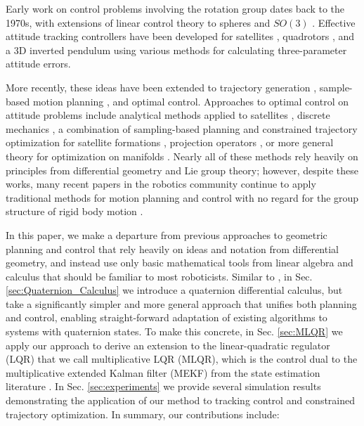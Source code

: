 \documentclass[letterpaper, 10 pt, conference]{ieeeconf}  %
\begin{document}
    Early work on control problems involving the rotation group dates back to the 1970s, 
    with extensions of linear control theory to spheres \cite{Brockett1973} and $SO(3)$ 
    \cite{Baillieul1978}. Effective attitude tracking controllers have been developed for 
    satellites \cite{wie1985quaternion}, quadrotors \cite{Fresk2013,Liu2015,lee2010geometric,
    Johnson2005,watterson2020control,mellinger2011minimum}, and a 3D inverted pendulum 
    \cite{Chaturvedi2009}  using various methods for calculating three-parameter attitude 
    errors. 
    
    More recently, these ideas have been extended to trajectory generation \cite{Zefran1998}, 
    sample-based motion planning \cite{Zefran1999,Kuffner2004}, and optimal control. 
    Approaches to optimal control on attitude problems include analytical methods applied to
    satellites \cite{Spindler1998}, discrete mechanics \cite{Kobilarov2011,Kobilarov2014,
    Lee2008}, a combination of sampling-based planning and constrained trajectory 
    optimization for satellite formations \cite{Garcia2005, Aoude2008}, projection operators 
    \cite{Saccon2013}, or more general theory for optimization on manifolds 
    \cites{watterson2018trajectory}. 
    Nearly all of these methods rely heavily on principles from differential geometry and 
    Lie group theory; however, despite these works, many recent papers in the robotics 
    community continue to apply traditional methods for motion planning and control with no 
    regard for the group structure of rigid body motion \cite{Alothman2016,deCrousaz2015,
    Williams2017,Geisert2016}.
    
    In this paper, we make a departure from previous approaches to geometric planning and 
    control that rely heavily on ideas and notation from differential geometry, 
    and instead use only basic mathematical tools from linear algebra and calculus that 
    should be familiar to most roboticists. 
    Similar to \cite{Mandic2011,Xu2016}, in Sec. \ref{sec:Quaternion_Calculus} we introduce 
    a quaternion differential calculus, but take a significantly simpler and more general 
    approach that unifies both planning and control, enabling straight-forward adaptation of 
    existing algorithms to systems with quaternion states. 
    To make this concrete, in Sec. \ref{sec:MLQR} we apply our approach to derive an 
    extension to the linear-quadratic regulator (LQR) that we call multiplicative LQR (MLQR), 
    which is the control dual to the multiplicative extended Kalman filter (MEKF) from the 
    state estimation literature \cite{markley2014fundamentals}. 
    In Sec. \ref{sec:experiments} we provide several simulation results demonstrating the 
    application of our method to tracking control and constrained trajectory optimization.
    In summary, our contributions include:
\end{document}
